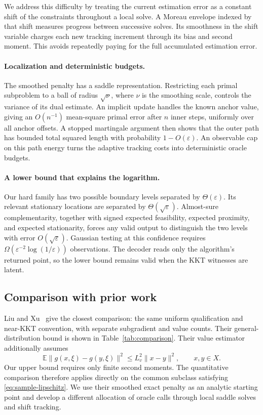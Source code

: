 \documentclass[11pt,a4paper]{article}
\newcommand{\E}{\mathbb E}
\newcommand{\eps}{\varepsilon}
\theoremstyle{remark}
\numberwithin{equation}{section}
\begin{document}
We address this difficulty by treating the current estimation error as a constant shift of the constraints throughout a local solve. A Moreau envelope indexed by that shift measures progress between successive solves. Its smoothness in the shift variable charges each new tracking increment through its bias and second moment. This avoids repeatedly paying for the full accumulated estimation error.

\paragraph{Localization and deterministic budgets.}
The smoothed penalty has a saddle representation. Restricting each primal subproblem to a ball of radius $\sqrt\nu$, where $\nu$ is the smoothing scale, controls the variance of its dual estimate. An implicit update handles the known anchor value, giving an $O(n^{-1})$ mean-square primal error after $n$ inner steps, uniformly over all anchor offsets. A stopped martingale argument then shows that the outer path has bounded total squared length with probability $1-O(\eps)$. An observable cap on this path energy turns the adaptive tracking costs into deterministic oracle budgets.

\paragraph{A lower bound that explains the logarithm.}
Our hard family has two possible boundary levels separated by $\Theta(\eps)$. Its relevant stationary locations are separated by $\Theta(\sqrt\eps)$. Almost-sure complementarity, together with signed expected feasibility, expected proximity, and expected stationarity, forces any valid output to distinguish the two levels with error $O(\sqrt\eps)$. Gaussian testing at this confidence requires $\Omega(\eps^{-2}\log(1/\eps))$ observations. The decoder reads only the algorithm's returned point, so the lower bound remains valid when the KKT witnesses are latent.

\subsection{Comparison with prior work}
Liu and Xu~\cite[Proposition~3.7(i), arXiv version~2]{liuxu} give the closest comparison: the same uniform qualification and near-KKT convention, with separate subgradient and value counts. Their general-distribution bound is shown in Table~\ref{tab:comparison}. Their value estimator additionally assumes
\begin{equation}
 \E\|g(x,\xi)-g(y,\xi)\|^2\le L_v^2\|x-y\|^2,
 \qquad x,y\in X.
 \label{eq:sample-lipschitz}
\end{equation}
Our upper bound requires only finite second moments. The quantitative comparison therefore applies directly on the common subclass satisfying \eqref{eq:sample-lipschitz}. We use their smoothed exact penalty as an analytic starting point and develop a different allocation of oracle calls through local saddle solves and shift tracking.
\end{document}
